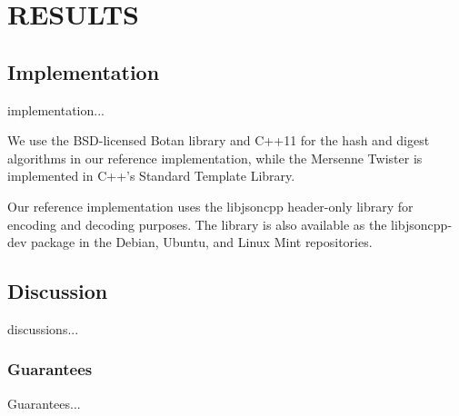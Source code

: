 
\chapter{\uppercase{Results}}

\section{Implementation}

implementation...

We use the BSD-licensed Botan library and C++11 for the hash and digest algorithms in our reference implementation, while the Mersenne Twister is implemented in C++'s Standard Template Library.

Our reference implementation uses the libjsoncpp header-only library for encoding and decoding purposes. The library is also available as the libjsoncpp-dev package in the Debian, Ubuntu, and Linux Mint repositories.

\section{Discussion}

discussions...

\subsection{Guarantees}

Guarantees...